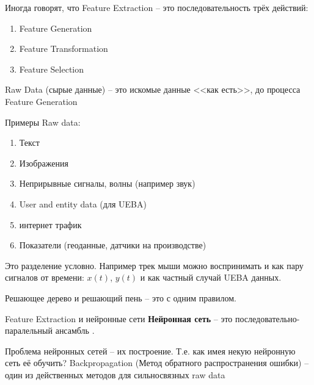 \begin{frame}
	Иногда говорят, что Feature Extraction -- это последовательность трёх действий:
	\begin{enumerate}
		\item Feature Generation 
		\item Feature Transformation 
		\item Feature Selection
	\end{enumerate}
\end{frame}

\begin{frame}{Raw Data}
	 (сырые данные) -- это искомые данные <<как есть>>, до процесса
	Feature Generation
	
	Примеры Raw data:
	\begin{enumerate}
		\item Текст
		\item Изображения
		\item Неприрывные сигналы, волны (например звук)
		\item User and entity data (для UEBA)
		\item интернет трафик
		\item Показатели (геоданные, датчики на производстве) 
	\end{enumerate}
	
	Это разделение условно. Например трек мыши можно воспринимать и
	как пару сигналов от времени: $x(t)$, $y(t)$ и как частный случай
	UEBA данных.
\end{frame}

\begin{frame}{Решающее дерево и решающий пень}
	 -- это 
	 с одним правилом.
	
	
	
\end{frame}

\begin{frame}{Feature Extraction и нейронные сети}
	\textbf{Нейронная сеть} --
	это последовательно-паралельный ансамбль 
	.
	
	
	Проблема нейронных сетей -- их построение. Т.е.
	как имея некую нейронную сеть её обучить?
	Backpropagation (Метод обратного распространения ошибки) 
	-- один из действенных методов для сильносвязных raw data
\end{frame}


